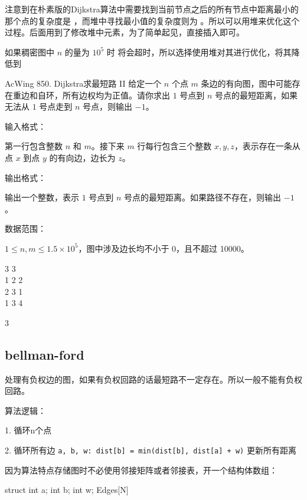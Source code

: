 注意到在朴素版的Dijkstra算法中需要找到当前节点之后的所有节点中距离最小的那个点的复杂度是 ，而堆中寻找最小值的复杂度则为 。所以可以用堆来优化这个过程。后面用到了修改堆中元素，为了简单起见，直接插入即可。

如果稠密图中 $n$ 的量为 $10^5$ 时  将会超时，所以选择使用堆对其进行优化，将其降低到 

\begin{titledbox}{AcWing 850. Dijkstra求最短路 II}
    给定一个 $n$ 个点 $m$ 条边的有向图，图中可能存在重边和自环，所有边权均为正值。请你求出 $1$ 号点到 $n$ 号点的最短距离，如果无法从 $1$ 号点走到 $n$ 号点，则输出 $-1$。

    输入格式：

    第一行包含整数 $n$ 和 $m$。接下来 $m$ 行每行包含三个整数 $x,y,z$，表示存在一条从点 $x$ 到点 $y$ 的有向边，边长为 $z$。

    输出格式：

    输出一个整数，表示 $1$ 号点到 $n$ 号点的最短距离。如果路径不存在，则输出 $-1$。

    数据范围：

    $1 \le n, m \le 1.5 \times 10^5$，图中涉及边长均不小于 0，且不超过 10000。

    \begin{inputblock}
        3 3 \\
        1 2 2 \\
        2 3 1 \\
        1 3 4
    \end{inputblock}
    \begin{outputblock}
        3
    \end{outputblock}
\end{titledbox}

\subsection{bellman-ford}
处理有负权边的图，如果有负权回路的话最短路不一定存在。所以一般不能有负权回路。

算法逻辑：

1. 循环n个点

2. 循环所有边 \lstinline{a, b, w: dist[b] = min(dist[b], dist[a] + w)} 更新所有距离

因为算法特点存储图时不必使用邻接矩阵或者邻接表，开一个结构体数组：

\begin{mycpponecol}[边集]
    struct {
        int a;
        int b;
        int w;
    } Edges[N]
\end{mycpponecol}

